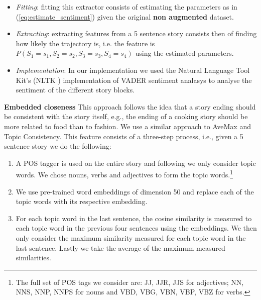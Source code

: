 \documentclass{article}
\begin{document}
\begin{itemize}
	\item \textit{Fitting}: fitting this extractor consists of estimating the parameters as in (\ref{eq:estimate_sentiment}) given the original \textbf{non augmented} dataset.
	\item \textit{Extracting}: extracting features from a 5 sentence story consists then of finding how likely the trajectory is, i.e. the feature is $P(S_1 = s_1, S_2=s_2, S_3=s_3, S_4=s_4)$ using the estimated parameters.
	\item \textit{Implementation}: In our implementation we used the Natural Language Tool Kit's (NLTK \cite{NLTK_VADER}) implementation of VADER sentiment analasys \cite{VADER} to analyse the sentiment of the different story blocks.
\end{itemize}

\textbf{Embedded closeness} This approach follows the idea that a story ending
should be consistent with the story itself, e.g., the ending of a cooking story
should be more related to food than to fashion. We use a similar approach to
AveMax\cite{LSTMClassifier} and Topic Consistency\cite{COGCOMP}. This feature
consists of a three-step process, i.e., given a 5 sentence story we do the
following:

\begin{enumerate}

        \item A POS tagger is used on the entire story and following
            \cite{COGCOMP} we only consider topic words. We chose nouns,
            verbs and adjectives to form the topic words.\footnote{The full set
                of POS tags we consider are: JJ, JJR, JJS for adjectives; NN,
                NNS, NNP, NNPS for nouns and VBD, VBG, VBN, VBP, VBZ for verbs.}

        \item We use pre-trained word embeddings of dimension 50 and replace
            each of the topic words with its respective embedding.

        \item For each topic word in the last sentence, the cosine similarity is
            measured to each topic word in the previous four sentences using
            the embeddings. We then only consider the maximum similarity
            measured for each topic word in the last sentence. Lastly we take
            the average of the maximum measured similarities.

\end{enumerate}
\end{document}
